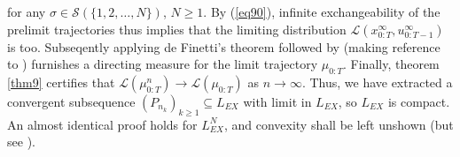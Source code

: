 \documentclass[12pt, oneside]{report}
\newcommand{\1}[1]{\mathbbm{1}_{\{#1\}}}
\newcommand{\mc}[1]{\mathcal{#1}}
\theoremstyle{definition}
\begin{document}
for any $\sigma\in\mc{S}(\{1,2,\dots,N\})$, $N\geq 1$. By (\ref{eq90}), infinite exchangeability of the prelimit trajectories thus implies that the limiting distribution $\mc{L}(x^\infty_{0:T},u^\infty_{0:T-1})$ is too. Subseqently applying de Finetti's theorem \cite[theorem 3.1]{Aldous_Ibragimov_1985} followed by \cite[lemma 2.15]{Aldous_Ibragimov_1985}
(making reference to \cite[definition 2.6]{Aldous_Ibragimov_1985}) furnishes a directing measure for the limit trajectory $\mu_{0:T}$. Finally, theorem \ref{thm9} certifies that $\mc{L}(\mu^n_{0:T})\rightarrow\mc{L}(\mu_{0:T})$ as $n\rightarrow\infty$. Thus, we have extracted a convergent subsequence $(P_{n_k})_{k\geq 1}\subseteq L_{EX}$ with limit in $L_{EX}$, so
$L_{EX}$ is compact. An almost identical proof holds for $L^N_{EX}$, and convexity shall be left unshown (but see \cite[appendix D]{Sanjari_Saldi_Yüksel_2024}).
\end{document}
